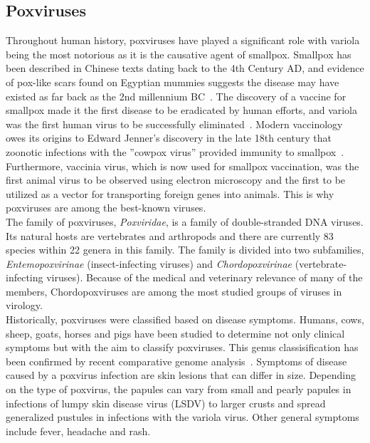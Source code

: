 \subsection{Poxviruses}
Throughout human history, poxviruses have played a significant role with variola being the most notorious as it is the causative agent of smallpox. Smallpox has been described in Chinese texts dating back to the 4th Century AD, and evidence of pox-like scars found on Egyptian mummies suggests the disease may have existed as far back as the 2nd millennium BC~\cite{fenner1988history}. The discovery of a vaccine for smallpox made it the first disease to be eradicated by human efforts, and variola was the first human virus to be successfully eliminated~\cite{fenner2000adventures}. Modern vaccinology owes its origins to Edward Jenner's discovery in the late 18th century that zoonotic infections with the ''cowpox virus'' provided immunity to smallpox~\cite{fenner1988history}. Furthermore, vaccinia virus, which is now used for smallpox vaccination, was the first animal virus to be observed using electron microscopy and the first to be utilized as a vector for transporting foreign genes into animals. This is why poxviruses are among the best-known viruses. \\
The family of poxviruses, \textit{Poxviridae}, is a family of double-stranded DNA viruses. Its natural hosts are vertebrates and arthropods and there are currently 83 species within 22 genera in this family. The family is divided into two subfamilies, \textit{Entemopoxvirinae} (insect-infecting viruses) and \textit{Chordopoxvirinae} (vertebrate-infecting viruses). Because of the medical and veterinary relevance of many of the members, Chordopoxviruses are among the most studied groups of viruses in virology. \\
Historically, poxviruses were classified based on disease symptoms. Humans, cows, sheep, goats, horses and pigs have been studied to determine not only clinical symptoms but with the aim to classify poxviruses. This genus classisification has been confirmed by recent comparative genome analysis~\cite{gubser2004poxvirus}. Symptoms of disease caused by a poxvirus infection are skin lesions that can differ in size. Depending on the type of poxvirus, the papules can vary from small and pearly papules in infections of lumpy skin disease virus (LSDV) to larger crusts and spread generalized pustules in infections with the variola virus. Other general symptoms include fever, headache and rash.

